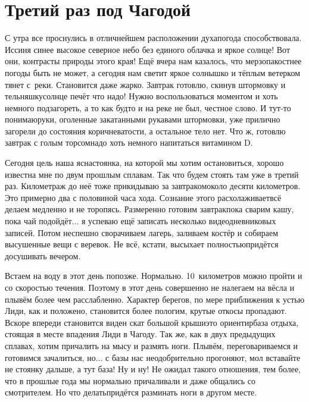 \chapter{Третий раз под Чагодой} 

С утра все проснулись в отличнейшем расположении духа\mdash погода способствовала. Иссиня синее высокое северное небо без единого облачка и яркое солнце! Вот они, контрасты природы этого края! Ещё вчера нам казалось, что мерзопакостнее погоды быть не может, а сегодня нам светит яркое солнышко и тёплым ветерком тянет с~реки. Становится даже жарко. Завтрак готовлю, скинув штормовку и тельняшку\mdash солнце печёт что надо! Нужно воспользоваться моментом и хоть немного подзагореть, а то как будто и на реке не был, честное слово. И тут-то понимаю\mdash руки, оголенные закатанными рукавами штормовки, уже прилично загорели до состояния коричневатости, а остальное тело нет. Что ж, готовлю завтрак с голым торсом\mdash надо хоть немного напитаться витамином D.

Сегодня цель наша ясна\mdash стоянка, на которой мы хотим остановиться, хорошо известна мне по двум прошлым сплавам. Так что будем стоять там уже в третий раз. Километраж до неё тоже прикидываю за завтраком\mdash около десяти километров. Это примерно два с половиной часа хода. Сознание этого расхолаживает\mdash всё делаем медленно и не торопясь. Размеренно готовим завтрак\mdash пока сварим кашу, пока чай подойдёт$\ldots$ я успеваю ещё записать несколько видеодневниковых записей. Потом неспешно сворачиваем лагерь, заливаем костёр и собираем высушенные вещи с веревок. Не всё, кстати, высыхает полностью\mdash придётся досушивать вечером.

Встаем на воду в этот день попозже. Нормально. 10~километров можно пройти и со скоростью течения. Поэтому в этот день совершенно не налегаем на вёсла и плывём более чем расслабленно.  Характер берегов, по мере приближения к устью Лиди, как и положено, становится более пологим, крутые откосы пропадают. Вскоре впереди становится виден скат большой крыши\mdash это ориентир\mdash база отдыха, стоящая в месте впадения Лиди в Чагоду. Так же, как в двух предыдущих сплавах, хотим причалить на мысу и размять ноги. Плывём, переговариваемся и готовимся зачалиться, но$\ldots$ с базы нас неодобрительно прогоняют, мол вставайте не стоянку дальше, а тут база! Ну и ну! Не ожидал такого отношения, тем более, что в прошлые года мы нормально причаливали и даже общались со смотрителем. Но что делать\mdash придётся разминать ноги в другом месте. 


